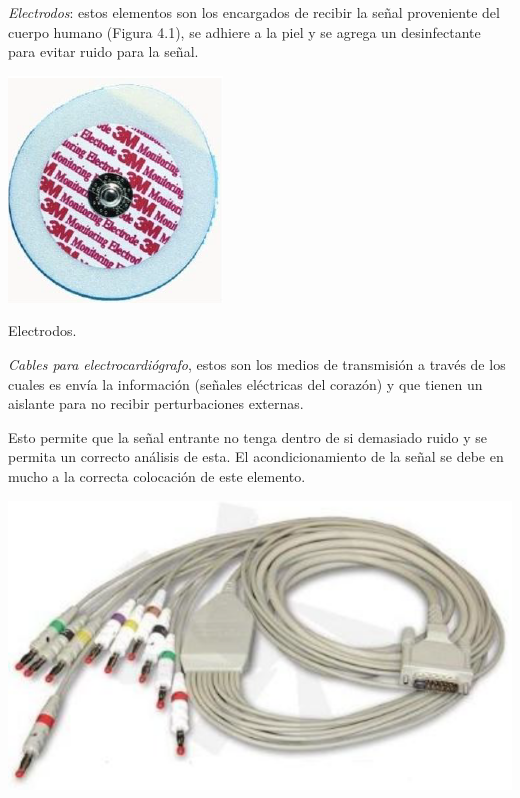\textit{Electrodos}: estos elementos son los encargados de recibir la señal proveniente del cuerpo humano (Figura 4.1), se adhiere a la piel y se agrega un desinfectante para evitar ruido para la señal.\newline
\begin{floatingfigure}[r]{4.5cm}
\includegraphics{imag/electrodo.PNG}
\caption{Electrodos.}
		\label{electrodos}
\end{floatingfigure}

\textit{Cables para electrocardiógrafo}, estos son los medios de transmisión a través de los cuales es envía la información (señales eléctricas del corazón) y que tienen un aislante para no recibir perturbaciones externas.\newline

Esto permite que la señal entrante no tenga dentro de si demasiado ruido y se permita un correcto análisis de esta. El acondicionamiento de la señal se debe en mucho a la correcta colocación de este elemento.\newline

\begin{floatingfigure}[r]{1.0cm}
\includegraphics{imag/cables.PNG}
\end{floatingfigure}

